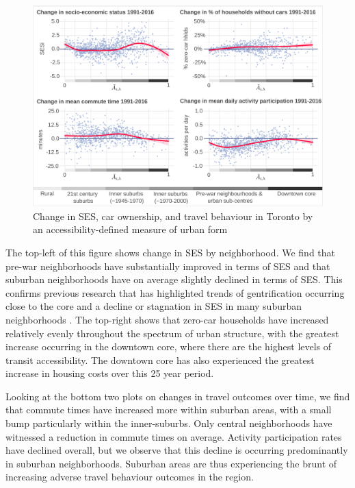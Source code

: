 \begin{figure}[H]
	\centering
	\vspace{2mm}
	\hspace*{-0.333in}
	\includegraphics[width=6.5in]{figures/Fig4}
	\caption{{Change in SES, car ownership, and travel behaviour in Toronto by an accessibility-defined measure of urban form}}
	\label{fig:sub_pov}
\end{figure}

The top-left of this figure shows change in SES by neighborhood. We find that pre-war neighborhoods have substantially improved in terms of SES and that suburban neighborhoods have on average slightly declined in terms of SES. This confirms previous research that has highlighted trends of gentrification occurring close to the core and a decline or stagnation in SES in many suburban neighborhoods \cite{ades_are_2012,hulchanski_three_2010,walks_social_2001,ades_is_2016}. The top-right shows that zero-car households have increased relatively evenly throughout the spectrum of urban structure, with the greatest increase occurring in the downtown core, where there are the highest levels of transit accessibility. The downtown core has also experienced the greatest increase in housing costs over this 25 year period.

Looking at the bottom two plots on changes in travel outcomes over time, we find that commute times have increased more within suburban areas, with a small bump particularly within the inner-suburbs. Only central neighborhoods have witnessed a reduction in commute times on average. Activity participation rates have declined overall, but we observe that this decline is occurring predominantly in suburban neighborhoods. Suburban areas are thus experiencing the brunt of increasing adverse travel behaviour outcomes in the region.

